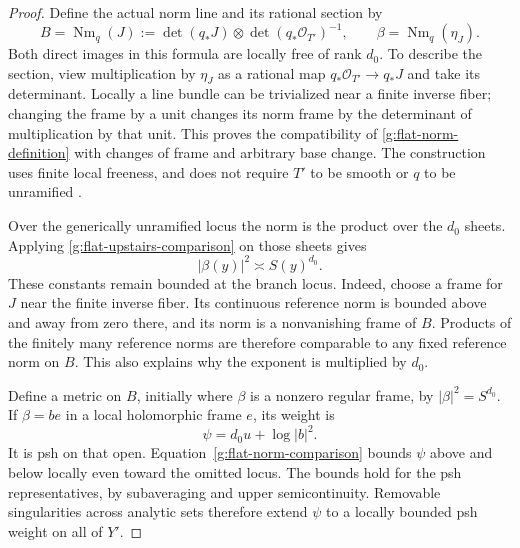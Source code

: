 \begin{proof}
Define the actual norm line and its rational section by
\begin{equation}
 B=\operatorname{Nm}_q(J)
   :=\det(q_*J)\otimes\det(q_*\mathcal O_{T'})^{-1},
 \qquad \beta=\operatorname{Nm}_q(\eta_J).
 \label{g:flat-norm-definition}
\end{equation}
Both direct images in this formula are locally free of rank \(d_0\).
To describe the section, view multiplication by \(\eta_J\) as a rational
map \(q_*\mathcal O_{T'}\to q_*J\) and take its determinant.
Locally a line bundle can be trivialized near a finite inverse fiber;
changing the frame by a unit changes its norm frame by the determinant
of multiplication by that unit.  This proves the compatibility of
\eqref{g:flat-norm-definition} with changes of frame and arbitrary base
change.  The construction uses finite local freeness, and does not
require \(T'\) to be smooth or \(q\) to be unramified
\cite[Tags~0BUT, 0BCX and 0BD2]{StacksProject}.

Over the generically unramified locus the norm is the product over the
\(d_0\) sheets.  Applying \eqref{g:flat-upstairs-comparison} on those
sheets gives
\begin{equation}
                         |\beta(y)|^2\asymp S(y)^{d_0}.
 \label{g:flat-norm-comparison}
\end{equation}
These constants remain bounded at the branch locus.  Indeed, choose a
frame for \(J\) near the finite inverse fiber.  Its continuous reference
norm is bounded above and away from zero there, and its norm is a
nonvanishing frame of \(B\).  Products of the finitely many reference
norms are therefore comparable to any fixed reference norm on \(B\).
This also explains why the exponent is multiplied by \(d_0\).

Define a metric on \(B\), initially where \(\beta\) is a nonzero regular
frame, by \(|\beta|^2=S^{d_0}\).  If \(\beta=b e\) in a local
holomorphic frame \(e\), its weight is
\[
                    \psi=d_0u+\log|b|^2.
\]
It is psh on that open.  Equation~\eqref{g:flat-norm-comparison} bounds
\(\psi\) above and below locally even toward the omitted locus.  The
bounds hold for the psh representatives, by subaveraging and upper
semicontinuity.  Removable singularities across analytic sets therefore
extend \(\psi\) to a locally bounded psh weight on all of \(Y'\).


\end{proof}
